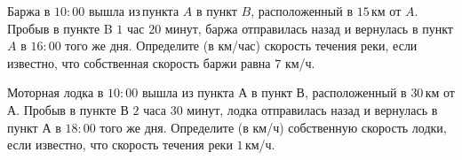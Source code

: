 \begin{class}[number=3]
\begin{listofex}
		\item Баржа в \( 10:00 \) вышла из пункта \( A \) в пункт \( B \), расположенный в \( 15 \) км от \( A \). Пробыв в пункте B \( 1 \) час \( 20 \) минут, баржа отправилась назад и вернулась в пункт \( A \) в \( 16:00 \) того же дня. Определите (в км/час) скорость течения реки, если известно, что собственная скорость баржи равна \( 7 \) км/ч.
		\item Моторная лодка в \( 10:00 \) вышла из пункта \( А \) в пункт \( В \), расположенный в \( 30 \) км от \( А \). Пробыв в пункте \( В \) \( 2 \) часа \( 30 \) минут, лодка отправилась назад и вернулась в пункт \( А \) в \( 18:00 \) того же дня. Определите (в км/ч) собственную скорость лодки, если известно, что скорость течения реки \( 1 \) км/ч.
	\end{listofex}
\end{class}


